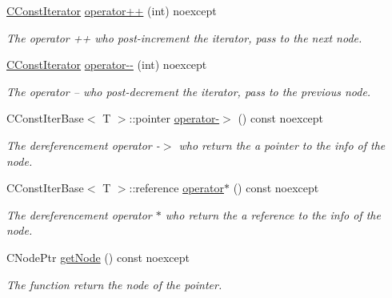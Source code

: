 \begin{DoxyCompactItemize}
\hyperlink{structnsSdD_1_1CList_1_1CConstIterator}{C\+Const\+Iterator} \hyperlink{structnsSdD_1_1CList_1_1CConstIterator_af63bd9514ce47807312698ac92a6cfec}{operator++} (int) noexcept
\begin{DoxyCompactList}\small\item\em The operator ++ who post-\/increment the iterator, pass to the next node. \end{DoxyCompactList}\item 
\hyperlink{structnsSdD_1_1CList_1_1CConstIterator}{C\+Const\+Iterator} \hyperlink{structnsSdD_1_1CList_1_1CConstIterator_a66443d7e5935d1b9703f477d49f2cdc8}{operator-\/-\/} (int) noexcept
\begin{DoxyCompactList}\small\item\em The operator -- who post-\/decrement the iterator, pass to the previous node. \end{DoxyCompactList}\item 
C\+Const\+Iter\+Base$<$ T $>$\+::pointer \hyperlink{structnsSdD_1_1CList_1_1CConstIterator_aee6015666c2eea5b396f1b1800b9b41d}{operator-\/$>$} () const noexcept
\begin{DoxyCompactList}\small\item\em The dereferencement operator -\/$>$ who return the a pointer to the info of the node. \end{DoxyCompactList}\item 
C\+Const\+Iter\+Base$<$ T $>$\+::reference \hyperlink{structnsSdD_1_1CList_1_1CConstIterator_a9c3bac52765a92e2ab2e964bf5df5e72}{operator$\ast$} () const noexcept
\begin{DoxyCompactList}\small\item\em The dereferencement operator $\ast$ who return the a reference to the info of the node. \end{DoxyCompactList}\item 
C\+Node\+Ptr \hyperlink{structnsSdD_1_1CList_1_1CConstIterator_a856f2ce0a4334188f7f5131159b24143}{get\+Node} () const noexcept
\begin{DoxyCompactList}\small\item\em The function return the node of the pointer. \end{DoxyCompactList}\end{DoxyCompactItemize}


